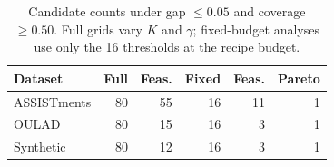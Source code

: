 \begin{table}[t]
\centering
\small
\caption{Candidate counts under gap $\leq0.05$ and coverage $\geq0.50$. Full grids vary $K$ and $\gamma$; fixed-budget analyses use only the 16 thresholds at the recipe budget.}
\label{tab:run-sweep}
\begin{tabular}{lrrrrr}
\toprule
Dataset & Full & Feas. & Fixed & Feas. & Pareto \\
\midrule
ASSISTments & 80 & 55 & 16 & 11 & 1 \\
OULAD & 80 & 15 & 16 & 3 & 1 \\
Synthetic & 80 & 12 & 16 & 3 & 1 \\
\bottomrule
\end{tabular}
\end{table}
